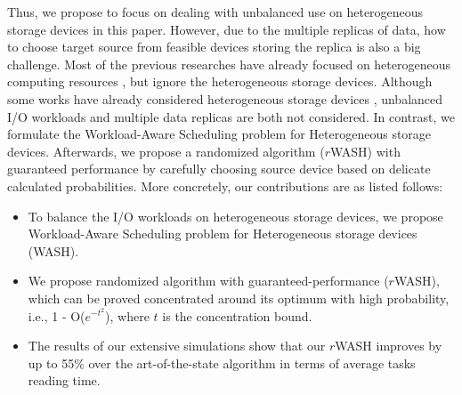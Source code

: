 \documentclass[conference]{IEEEtran}
\begin{document}
 
Thus, we propose to focus on dealing with unbalanced use on heterogeneous storage devices in this paper. However, due to the multiple replicas of data, how to choose target source from feasible devices storing the replica is also a big challenge.
Most of the previous researches have already focused on heterogeneous computing resources \cite{b25}\cite{b26}\cite{b35}\cite{b36}, but ignore the heterogeneous storage devices. Although some works have already considered heterogeneous storage devices \cite{b6}\cite{b7}, unbalanced I/O workloads and multiple data replicas are both not considered. In contrast, we formulate the Workload-Aware Scheduling problem for Heterogeneous storage devices. Afterwards, we propose a randomized algorithm ($r$WASH) with guaranteed performance by carefully choosing source device based on delicate calculated probabilities.
More concretely, our contributions are as listed follows: 

\begin{itemize}
\item To balance the I/O workloads on heterogeneous storage devices, we propose Workload-Aware Scheduling problem for Heterogeneous storage devices (WASH).
\item We propose randomized algorithm with guaranteed-performance ($r$WASH), which can be proved concentrated around its optimum with high probability, i.e., 1 - O($e^{-t^2}$), where $t$ is the concentration bound.
\item The results of our extensive simulations show that our $r$WASH improves by up to 55\% over the art-of-the-state algorithm in terms of average tasks reading time.
\end{itemize}
\end{document}
